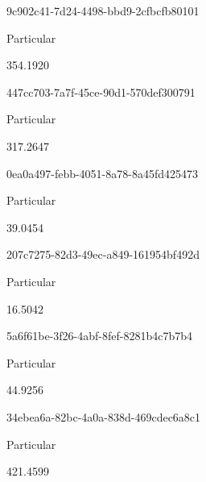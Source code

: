 \documentclass[
  11pt,
  a4paper,
  DIV=11,
  numbers=noendperiod]{scrartcl}
\begin{document}
\n    

\n    

\n      

9c902c41-7d24-4498-bbd9-2cfbcfb80101

\n      

Particular

\n      

354.1920

\n    

\n    

\n      

447cc703-7a7f-45ce-90d1-570def300791

\n      

Particular

\n      

317.2647

\n    

\n    

\n      

0ea0a497-febb-4051-8a78-8a45fd425473

\n      

Particular

\n      

39.0454

\n    

\n    

\n      

207c7275-82d3-49ec-a849-161954bf492d

\n      

Particular

\n      

16.5042

\n    

\n    

\n      

5a6f61be-3f26-4abf-8fef-8281b4c7b7b4

\n      

Particular

\n      

44.9256

\n    

\n    

\n      

34ebea6a-82bc-4a0a-838d-469cdec6a8c1

\n      

Particular

\n      

421.4599

\n    
\end{document}
